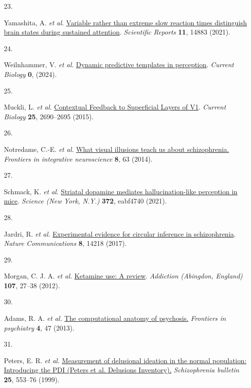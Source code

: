 \documentclass[
]{article}
\newlength{\cslhangindent}
\newlength{\csllabelwidth}
\newenvironment{CSLReferences}[2] %
 {\begin{list}{}{%
  \setlength{\itemindent}{0pt}
  \setlength{\leftmargin}{0pt}
  \setlength{\parsep}{0pt}
  \ifodd #1
   \setlength{\leftmargin}{\cslhangindent}
   \setlength{\itemindent}{-1\cslhangindent}
  \fi
  \setlength{\itemsep}{#2\baselineskip}}}
 {\end{list}}
\newcommand{\CSLLeftMargin}[1]{\parbox[t]{\csllabelwidth}{\strut#1\strut}}
\newcommand{\CSLRightInline}[1]{\parbox[t]{\linewidth - \csllabelwidth}{\strut#1\strut}}
\begin{document}
\begin{CSLReferences}{0}{0}
\CSLLeftMargin{23. }%
\CSLRightInline{Yamashita, A. \emph{et al.}
\href{https://doi.org/10.1038/s41598-021-94161-0}{Variable rather than
extreme slow reaction times distinguish brain states during sustained
attention}. \emph{Scientific Reports} \textbf{11}, 14883 (2021).}

\CSLLeftMargin{24. }%
\CSLRightInline{Weilnhammer, V. \emph{et al.}
\href{https://doi.org/10.1016/j.cub.2024.07.087}{Dynamic predictive
templates in perception}. \emph{Current Biology} \textbf{0}, (2024).}

\CSLLeftMargin{25. }%
\CSLRightInline{Muckli, L. \emph{et al.}
\href{https://doi.org/10.1016/j.cub.2015.08.057}{Contextual {Feedback}
to {Superficial} {Layers} of {V1}}. \emph{Current Biology} \textbf{25},
2690--2695 (2015).}

\CSLLeftMargin{26. }%
\CSLRightInline{Notredame, C.-E. \emph{et al.}
\href{https://doi.org/10.3389/fnint.2014.00063}{What visual illusions
teach us about schizophrenia.} \emph{Frontiers in integrative
neuroscience} \textbf{8}, 63 (2014).}

\CSLLeftMargin{27. }%
\CSLRightInline{Schmack, K. \emph{et al.}
\href{https://doi.org/10.1126/science.abf4740}{Striatal dopamine
mediates hallucination-like perception in mice}. \emph{Science (New
York, N.Y.)} \textbf{372}, eabf4740 (2021).}

\CSLLeftMargin{28. }%
\CSLRightInline{Jardri, R. \emph{et al.}
\href{https://doi.org/10.1038/ncomms14218}{Experimental evidence for
circular inference in schizophrenia}. \emph{Nature Communications}
\textbf{8}, 14218 (2017).}

\CSLLeftMargin{29. }%
\CSLRightInline{Morgan, C. J. A. \emph{et al.}
\href{https://doi.org/10.1111/j.1360-0443.2011.03576.x}{Ketamine use: A
review}. \emph{Addiction (Abingdon, England)} \textbf{107}, 27--38
(2012).}

\CSLLeftMargin{30. }%
\CSLRightInline{Adams, R. A. \emph{et al.}
\href{https://doi.org/10.3389/fpsyt.2013.00047}{The computational
anatomy of psychosis.} \emph{Frontiers in psychiatry} \textbf{4}, 47
(2013).}

\CSLLeftMargin{31. }%
\CSLRightInline{Peters, E. R. \emph{et al.}
\href{https://www.ncbi.nlm.nih.gov/pubmed/10478789}{Measurement of
delusional ideation in the normal population: Introducing the {PDI}
({Peters} et al. {Delusions} {Inventory}).} \emph{Schizophrenia
bulletin} \textbf{25}, 553--76 (1999).}


\end{CSLReferences}
\end{document}
